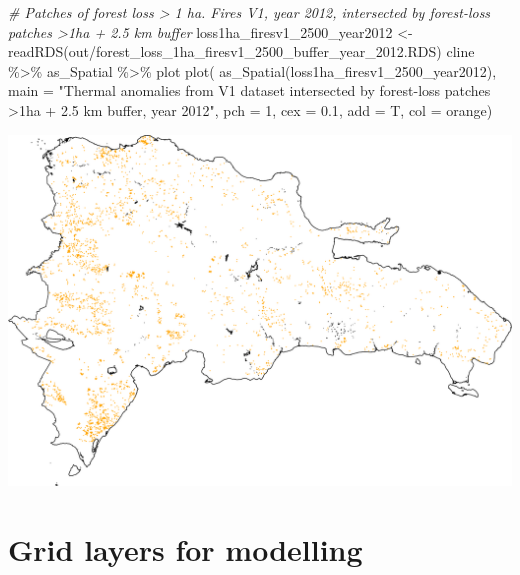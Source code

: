\documentclass[10pt,landscape,a3paper]{article}
\newenvironment{Shaded}{\begin{snugshade}}{\end{snugshade}}
\newcommand{\AttributeTok}[1]{\textcolor[rgb]{0.77,0.63,0.00}{#1}}
\newcommand{\CommentTok}[1]{\textcolor[rgb]{0.56,0.35,0.01}{\textit{#1}}}
\newcommand{\DecValTok}[1]{\textcolor[rgb]{0.00,0.00,0.81}{#1}}
\newcommand{\FloatTok}[1]{\textcolor[rgb]{0.00,0.00,0.81}{#1}}
\newcommand{\FunctionTok}[1]{\textcolor[rgb]{0.00,0.00,0.00}{#1}}
\newcommand{\NormalTok}[1]{#1}
\newcommand{\OtherTok}[1]{\textcolor[rgb]{0.56,0.35,0.01}{#1}}
\newcommand{\SpecialCharTok}[1]{\textcolor[rgb]{0.00,0.00,0.00}{#1}}
\newcommand{\StringTok}[1]{\textcolor[rgb]{0.31,0.60,0.02}{#1}}
\begin{document}
\begin{Shaded}
\begin{Highlighting}[]
\CommentTok{\# Patches of forest loss \textgreater{} 1 ha. Fires V1, year 2012, intersected by forest{-}loss patches \textgreater{}1ha + 2.5 km buffer}
\NormalTok{loss1ha\_firesv1\_2500\_year2012 }\OtherTok{\textless{}{-}} \FunctionTok{readRDS}\NormalTok{(}\StringTok{\textquotesingle{}out/forest\_loss\_1ha\_firesv1\_2500\_buffer\_year\_2012.RDS\textquotesingle{}}\NormalTok{)}
\NormalTok{cline }\SpecialCharTok{\%\textgreater{}\%}\NormalTok{ as\_Spatial }\SpecialCharTok{\%\textgreater{}\%}\NormalTok{ plot}
\FunctionTok{plot}\NormalTok{(}
  \FunctionTok{as\_Spatial}\NormalTok{(loss1ha\_firesv1\_2500\_year2012),}
  \AttributeTok{main =} \StringTok{"Thermal anomalies from V1 dataset intersected by forest{-}loss patches \textgreater{}1ha + 2.5 km buffer, year 2012"}\NormalTok{,}
  \AttributeTok{pch =} \DecValTok{1}\NormalTok{, }\AttributeTok{cex =} \FloatTok{0.1}\NormalTok{, }\AttributeTok{add =}\NormalTok{ T, }\AttributeTok{col =} \StringTok{\textquotesingle{}orange\textquotesingle{}}\NormalTok{)}
\end{Highlighting}
\end{Shaded}

\begin{center}\includegraphics{img/data-download-preparation-eda/fires-m6-v1-sel-2500km-buffer-2} \end{center}

\hypertarget{grid-layers-for-modelling}{%
\section{Grid layers for modelling}\label{grid-layers-for-modelling}}
\end{document}
